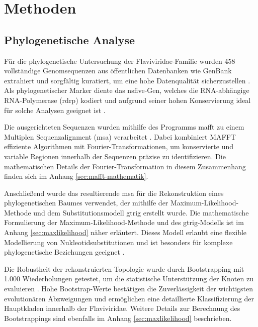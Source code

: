 \chapter{Methoden} \label{chap:methoden}

\section{Phylogenetische Analyse} \label{sec:phylogenetische-analyse}

Für die phylogenetische Untersuchung der Flaviviridae-Familie wurden 458 vollständige Genomsequenzen aus öffentlichen Datenbanken wie GenBank extrahiert und sorgfältig kuratiert, um eine hohe Datenqualität sicherzustellen \autocite{mifsudMappingGlycoproteinStructure2024}. Als phylogenetischer Marker diente das \gls{nsfive}-Gen, welches die RNA-abhängige RNA-Polymerase (\gls{rdrp}) kodiert und aufgrund seiner hohen Konservierung ideal für solche Analysen geeignet ist \autocite{Koonin1991}.

Die ausgerichteten Sequenzen wurden mithilfe des Programms \gls{mafft} zu einem Multiplen Sequenzalignment (\gls{msa}) verarbeitet \autocite{Katoh2013}. Dabei kombiniert MAFFT effiziente Algorithmen mit Fourier-Transformationen, um konservierte und variable Regionen innerhalb der Sequenzen präzise zu identifizieren. Die mathematischen Details der Fourier-Transformation in diesem Zusammenhang finden sich im Anhang \ref{sec:mafft-mathematik}.

Anschließend wurde das resultierende \gls{msa} für die Rekonstruktion eines phylogenetischen Baumes verwendet, der mithilfe der Maximum-Likelihood-Methode und dem Substitutionsmodell \gls{gtrig} erstellt wurde. Die mathematische Formulierung der Maximum-Likelihood-Methode und des \gls{gtrig}-Modells ist im Anhang \ref{sec:maxlikelihood} näher erläutert. Dieses Modell erlaubt eine flexible Modellierung von Nukleotidsubstitutionen und ist besonders für komplexe phylogenetische Beziehungen geeignet \autocite{Tavare1986}.

Die Robustheit der rekonstruierten Topologie wurde durch Bootstrapping mit 1.000 Wiederholungen getestet, um die statistische Unterstützung der Knoten zu evaluieren \autocite{Felsenstein1985}. Hohe Bootstrap-Werte bestätigen die Zuverlässigkeit der wichtigsten evolutionären Abzweigungen und ermöglichen eine detaillierte Klassifizierung der Hauptkladen innerhalb der Flaviviridae. Weitere Details zur Berechnung des Bootstrappings sind ebenfalls im Anhang \ref{sec:maxlikelihood} beschrieben.

